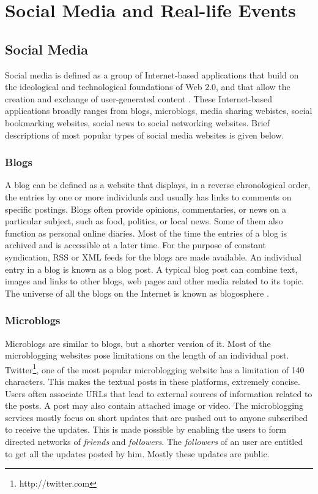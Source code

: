 
\chapter{Social Media and Real-life Events} %

\label{events} %

\doublespacing
\setlength{\parindent}{1cm}
\section{Social Media}
Social media is defined as a group of Internet-based applications that build on the ideological and technological foundations of Web 2.0, and that allow the creation and exchange of user-generated content \cite{kaplan2010users}. These Internet-based applications broadly ranges from blogs, microblogs, media sharing webistes, social bookmarking websites, social news to social networking websites. Brief descriptions of most popular types of social media websites is given below.

\subsection{Blogs}
A blog can be defined as a website that displays, in a reverse chronological order, the entries by one or more individuals and usually has links to comments on specific postings. Blogs often provide opinions, commentaries, or news on a particular subject, such as food, politics, or local news. Some of them also function as personal online diaries. Most of the time the entries of a blog is archived and is accessible at a later time. For the purpose of constant syndication, RSS or XML feeds for the blogs are made available. An individual entry in a blog is known as a blog post. A typical blog post can combine text, images and links to other blogs, web pages and other media related to its topic. The universe of all the blogs on the Internet is known as blogosphere \cite{agarwal2014time}.

\subsection{Microblogs}
Microblogs are similar to blogs, but a shorter version of it. Most of the microblogging websites pose limitations on the length of an individual post. Twitter\footnote{http://twitter.com}, one of the most popular microblogging website has a limitation of 140 characters. This makes the textual posts in these platforms, extremely concise. Users often associate URLs that lead to external sources of information related to the posts. A post may also contain attached image or video. The microblogging services mostly focus on short updates that are pushed out to anyone subscribed to receive the updates. This is made possible by enabling the users to form directed networks of \textit{friends} and \textit{followers}. The \textit{followers} of an user are entitled to get all the updates posted by him. Mostly these updates are public. 


